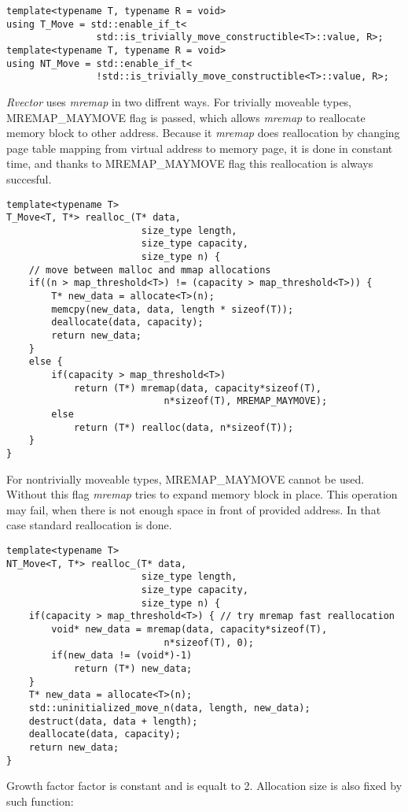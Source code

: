 \documentclass[inz, english, shortabstract]{iithesis}
\begin{document}
\begin{lstlisting}[caption=SFINAE policies]
template<typename T, typename R = void>
using T_Move = std::enable_if_t<
				std::is_trivially_move_constructible<T>::value, R>;
template<typename T, typename R = void>
using NT_Move = std::enable_if_t<
				!std::is_trivially_move_constructible<T>::value, R>;
\end{lstlisting}
{\it Rvector} uses {\it mremap} in two diffrent ways. For trivially moveable types, MREMAP\_MAYMOVE flag is passed, which allows {\it mremap} to reallocate memory block to other address. Because it {\it mremap} does reallocation by changing page table mapping from virtual address to memory page\cite{mremap}, it is done in constant time, and thanks to MREMAP\_MAYMOVE flag this reallocation is always succesful. 

\begin{lstlisting}[caption=rvector trivial type reallocation]
template<typename T>
T_Move<T, T*> realloc_(T* data, 
						size_type length, 
						size_type capacity, 
						size_type n) {
	// move between malloc and mmap allocations
	if((n > map_threshold<T>) != (capacity > map_threshold<T>)) {
        T* new_data = allocate<T>(n);
        memcpy(new_data, data, length * sizeof(T));
        deallocate(data, capacity);
        return new_data;
    }
    else {
        if(capacity > map_threshold<T>)
        	return (T*) mremap(data, capacity*sizeof(T), 
                    		n*sizeof(T), MREMAP_MAYMOVE);
        else
        	return (T*) realloc(data, n*sizeof(T));
    }
}
\end{lstlisting}
For nontrivially moveable types, MREMAP\_MAYMOVE cannot be used. Without this flag {\it mremap} tries to expand memory block in place. This operation may fail, when there is not enough space in front of provided address. In that case standard reallocation is done.

\begin{lstlisting}[caption=rvector nontrivial type reallocation]
template<typename T>
NT_Move<T, T*> realloc_(T* data, 
						size_type length, 
						size_type capacity, 
						size_type n) {
    if(capacity > map_threshold<T>) { // try mremap fast reallocation
        void* new_data = mremap(data, capacity*sizeof(T), 
                    		n*sizeof(T), 0);
        if(new_data != (void*)-1)
        	return (T*) new_data;
    }
    T* new_data = allocate<T>(n);
    std::uninitialized_move_n(data, length, new_data);
    destruct(data, data + length);
    deallocate(data, capacity);
    return new_data;
}
\end{lstlisting}
Growth factor factor is constant and is equalt to 2. Allocation size is also fixed by such function: 
\end{document}
